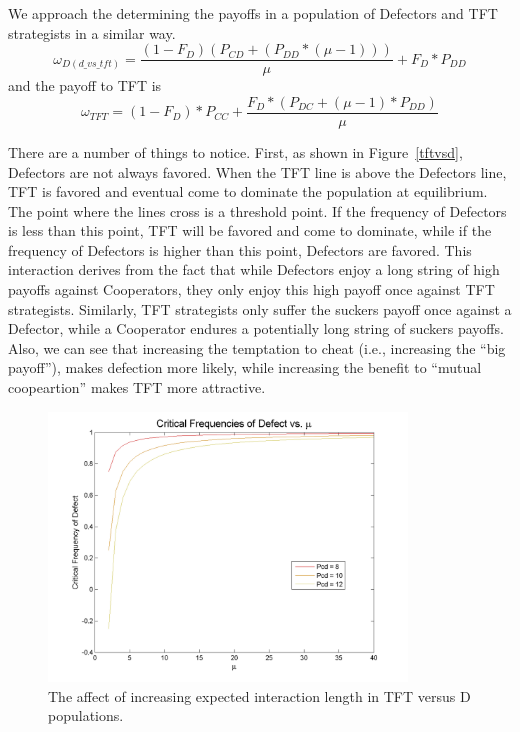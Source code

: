 \documentclass[11pt]{article} %
\begin{document}
We approach the determining the payoffs in a population of Defectors and TFT strategists in a similar way.
\begin{equation}
	\omega_{D(d\_vs\_tft)} = \frac{(1 - F_{D})(P_{CD} + (P_{DD} * (\mu - 1)))}{\mu} + F_D * P_{DD}
	\label{d_in_dvstft}
\end{equation}
and  the payoff to TFT is
\begin{equation}
	\omega_{TFT} = (1-F_{D}) * P_{CC} + \frac{F_{D} * (P_{DC} + (\mu - 1) * P_{DD})}{\mu}
	\label{tft_in_dvstft}
\end{equation}

There are a number of things to notice. First, as shown in Figure~\ref{tftvsd}, Defectors are not always favored. When the TFT line is above the Defectors line, TFT is favored and eventual come to dominate the population at equilibrium. The point where the lines cross is a threshold point. If the frequency of Defectors is less than this point, TFT will be favored and come to dominate, while if the frequency of Defectors is higher than this point, Defectors are favored. This interaction derives from the fact that while Defectors enjoy a long string of high payoffs against Cooperators, they only enjoy this high payoff once against TFT strategists. Similarly, TFT strategists only suffer the suckers payoff once against a Defector, while a Cooperator endures a potentially long string of suckers payoffs.  Also, we can see that increasing the temptation to cheat (i.e., increasing the ``big payoff''), makes defection more likely, while increasing the benefit to ``mutual coopeartion'' makes TFT more attractive. 

\begin{figure}[ht]
	\centering
	\includegraphics[width=0.85\textwidth]{files/figures/fdcrit.png}
	\caption{The affect of increasing expected interaction length in TFT versus D populations.}
	\label{muintft}
\end{figure}
\end{document}
